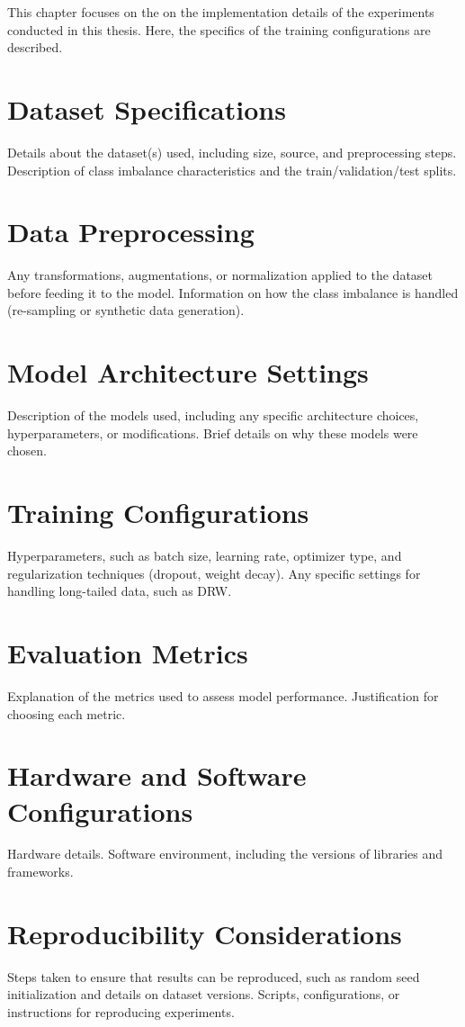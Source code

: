 
This chapter focuses on the on the implementation details of the experiments conducted in this thesis. Here, the specifics of the training configurations are described. 

\section{Dataset Specifications}
Details about the dataset(s) used, including size, source, and preprocessing steps.
Description of class imbalance characteristics and the train/validation/test splits.

\section{Data Preprocessing}
Any transformations, augmentations, or normalization applied to the dataset before feeding it to the model.
Information on how the class imbalance is handled (re-sampling or synthetic data generation).

\section{Model Architecture Settings}
Description of the models used, including any specific architecture choices, hyperparameters, or modifications.
Brief details on why these models were chosen.

\section{Training Configurations}
Hyperparameters, such as batch size, learning rate, optimizer type, and regularization techniques (dropout, weight decay).
Any specific settings for handling long-tailed data, such as DRW.

\section{Evaluation Metrics}
Explanation of the metrics used to assess model performance.
Justification for choosing each metric.

\section{Hardware and Software Configurations}
Hardware details.
Software environment, including the versions of libraries and frameworks.

\section{Reproducibility Considerations}
Steps taken to ensure that results can be reproduced, such as random seed initialization and details on dataset versions.
Scripts, configurations, or instructions for reproducing experiments.
